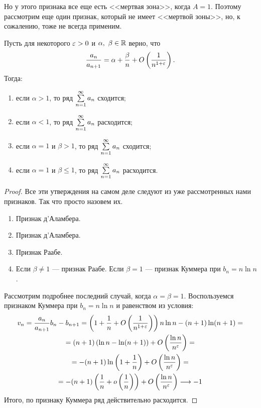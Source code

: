 Но у этого признака все еще есть <<мертвая зона>>, когда $A = 1$. Поэтому рассмотрим еще один признак, который не имеет <<мертвой зоны>>, но, к сожалению, тоже не всегда применим.

\begin{Test}
Пусть для некоторого $\varepsilon > 0$ и $\alpha,\ \beta \in \mathbb{R}$ верно, что 
$$
\dfrac{a_n}{a_{n+1}} = \alpha + \frac{\beta}{n} + O\left( \frac{1}{n^{1+\varepsilon}} \right).
$$
Тогда:
\begin{enumerate}
\item если $\alpha > 1$, то ряд $\sum\limits_{n=1}^{\infty}a_n$ сходится;
\item если $\alpha < 1$, то ряд $\sum\limits_{n=1}^{\infty}a_n$ расходится;
\item если $\alpha=1$ и $\beta>1$, то ряд $\sum\limits_{n=1}^{\infty}a_n$ сходится;
\item если $\alpha=1$ и $\beta\leq1$, то ряд $\sum\limits_{n=1}^{\infty}a_n$ расходится.
\end{enumerate}
\end{Test}

\begin{proof}
Все эти утверждения на самом деле следуют из уже рассмотренных нами признаков. Так что просто назовем их.
\begin{enumerate}
\item Признак д'Аламбера.
\item Признак д'Аламбера.
\item Признак Раабе.
\item Если $\beta\neq1$ --- признак Раабе. Если $\beta = 1$ --- признак Куммера при $b_n = n\ln n$.
\end{enumerate}
Рассмотрим подробнее последний случай, когда $\alpha=\beta=1$. Воспользуемся признаком Куммера при $b_n = n\ln n$ и равенством из условия:
\begin{gather*}
v_n = \frac{a_n}{a_{n+1}}b_n - b_{n+1} = \left( 1 + \frac{1}{n} + O\left( \frac{1}{n^{1+\varepsilon}}\right) \right)n\ln n - (n+1)\ln(n+1) = \\
= (n+1)\left( \ln n - \ln(n+1) \right) + O\left( \frac{\ln n}{n^\varepsilon} \right) = \\
= -(n+1)\ln\left( 1 + \frac{1}{n} \right) + O\left( \frac{\ln n}{n^\varepsilon} \right) = \\
= -(n+1)\left( \frac{1}{n} + o\left(\frac{1}{n}\right) \right) + O\left( \frac{\ln n}{n^\varepsilon} \right) \longrightarrow -1
\end{gather*}
Итого, по признаку Куммера ряд действительно расходится.
\end{proof}

